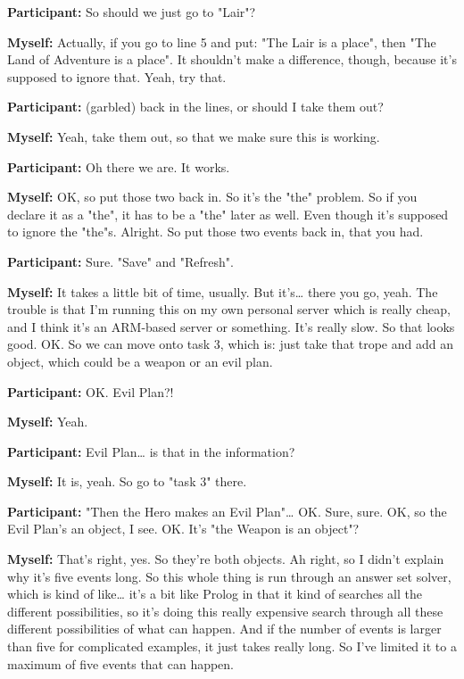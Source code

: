 \documentclass[11pt]{report}
\newcommand{\llabel}[1]{\hypertarget{llineno:#1}{\linelabel{#1}}}
\begin{document}
\begin{linenumbers}
\textbf{Participant:} So should we just go to "Lair"?

\textbf{Myself:} Actually, if you go to line 5 and put: "The Lair is a place", then "The Land of Adventure is a place". It shouldn't make a difference, though, because it's supposed to ignore that. Yeah, try that.

\textbf{Participant:} (garbled) back in the lines, or should I take them out?

\textbf{Myself:} Yeah, take them out, so that we make sure this is working.

\textbf{Participant:} Oh there we are. It works.

\textbf{Myself:} OK, so put those two back in. So it's the "the" problem. So if
you declare it as a "the", it has to be a "the" later as well. Even though it's
supposed to ignore the "the"s. Alright. So put those two events back in, that
you had.\llabel{lne:syntax3e2}

\textbf{Participant:} Sure. "Save" and "Refresh".

\textbf{Myself:} It takes a little bit of time, usually. But it's\ldots{} there you go, yeah. The trouble is that I'm running this on my own personal server which is really cheap, and I think it's an ARM-based server or something. It's really slow. So that looks good. OK. So we can move onto task 3, which is: just take that trope and add an object, which could be a weapon or an evil plan.

\textbf{Participant:} OK. Evil Plan?!

\textbf{Myself:} Yeah.

\textbf{Participant:} Evil Plan\ldots{} is that in the information?

\textbf{Myself:} It is, yeah. So go to "task 3" there.

\textbf{Participant:} "Then the Hero makes an Evil Plan"\ldots{} OK. Sure, sure. OK, so the Evil Plan's an object, I see. OK. It's "the Weapon is an object"?

\textbf{Myself:} That's right, yes. So they're both objects. Ah right, so I
didn't explain why it's five events long. So this whole thing is run through an
answer set solver, which is kind of like\ldots{} it's a bit like Prolog in that
it kind of searches all the different possibilities, so it's doing this really
expensive search through all these different possibilities of what can happen.
And if the number of events is larger than five for complicated examples, it
just takes really long. So I've limited it to a maximum of five events that can
happen.\llabel{lne:bug1e2}


\end{linenumbers}
\end{document}
